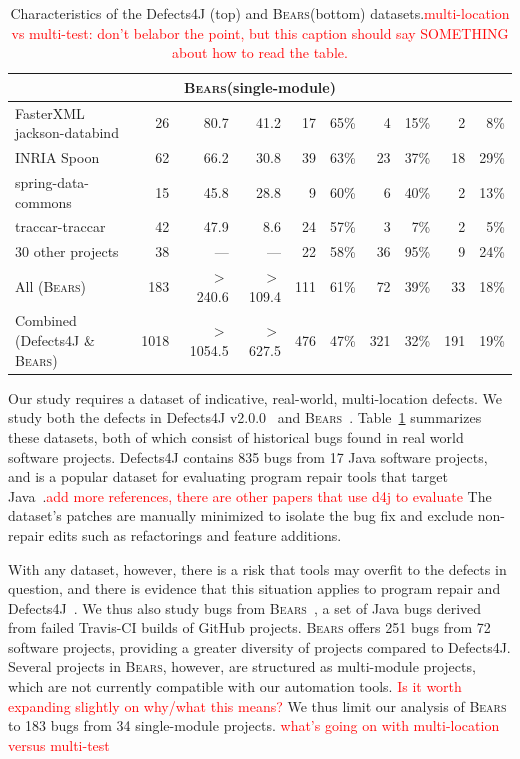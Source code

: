 \documentclass[10pt, conference]{IEEEtran}
\newcommand\todo[1]{\textcolor{red}{#1}}
\newcommand\bears{\textsc{Bears}\xspace}
\begin{document}
\begin{table}
\begin{center}
\begin{tabular}{l  rrr | rr | rr | rr}
\midrule
\multicolumn{10}{c}{\textbf{\bears (single-module)}} \\
\midrule
FasterXML jackson-databind & 26 & 80.7 & 41.2 & 17 & 65\% & 4 & 15\% & 2 & 8\%\\
INRIA Spoon & 62 & 66.2 & 30.8  & 39 & 63\% & 23 & 37\% & 18 & 29\%\\
spring-data-commons & 15 & 45.8 & 28.8  & 9 & 60\% & 6 & 40\% & 2 & 13\%\\
traccar-traccar & 42 & 47.9 & 8.6 & 24 & 57\% & 3 & 7\% & 2 & 5\%\\
30 other projects & 38 & --- & --- & 22 & 58\% & 36 & 95\% & 9 & 24\%\\
\midrule
All (\bears) & 183 & $>$240.6 & $>$109.4 & 111 & 61\% & 72 & 39\% & 33 & 18\% \\
\midrule
Combined (Defects4J \& \bears) & 1018 & $>$1054.5 & $>$627.5 & 476 & 47\% & 321 & 32\% & 191 & 19\%\\
\bottomrule
\end{tabular}
\end{center}
\caption{\label{tab:dataset-characteristics} Characteristics of the Defects4J
  (top) and \bears (bottom) datasets.\todo{multi-location vs multi-test: don't
    belabor the point, but this caption should say SOMETHING about how to read
    the table.}}
\end{table}

Our study requires a dataset of indicative, real-world,
multi-location defects.  We study both the defects in
Defects4J v2.0.0~\cite{defects4j} and \bears~\cite{bears}.  Table~\ref{tab:dataset-characteristics}
summarizes these datasets, both of which
consist of historical
bugs found in real world software projects. Defects4J contains 835 bugs from 
17 Java software projects, and is a popular dataset for evaluating 
program repair tools that target Java~\cite{durieux-repair-them-all}.\todo{add
  more references, there are other papers that use d4j to evaluate}
The dataset's patches are manually minimized to isolate the bug fix 
and exclude non-repair edits such as refactorings and feature additions.

With any dataset, however, there is a risk that tools may overfit
to the defects in question, and there is evidence that this situation applies to
program repair and Defects4J~\cite{durieux-repair-them-all}. 
We thus also study bugs from \bears~\cite{bears}, 
a set of Java bugs derived from failed Travis-CI builds of GitHub projects. 
\bears offers 251 bugs from 72 software projects, providing a greater diversity of 
projects compared to Defects4J. 
Several projects in \bears, however, are structured as multi-module projects, 
which are not currently compatible with our automation tools.
\todo{Is it worth expanding slightly on why/what this means?}
We thus limit our analysis of \bears to 183 bugs from 34 single-module projects.
\todo{what's going on with multi-location versus multi-test}
\end{document}
